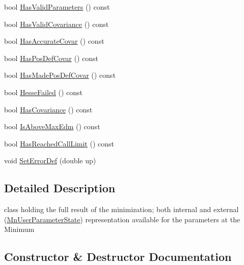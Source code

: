 \begin{DoxyCompactItemize}
bool \mbox{\hyperlink{classROOT_1_1Minuit2_1_1FunctionMinimum_a723b0ab6157e57113a142f1d4a31ace2}{Has\+Valid\+Parameters}} () const
\item 
bool \mbox{\hyperlink{classROOT_1_1Minuit2_1_1FunctionMinimum_ac2510d8f560ddac6b2911bda454e2948}{Has\+Valid\+Covariance}} () const
\item 
bool \mbox{\hyperlink{classROOT_1_1Minuit2_1_1FunctionMinimum_a5135f697042ef9ad81c68185c8610019}{Has\+Accurate\+Covar}} () const
\item 
bool \mbox{\hyperlink{classROOT_1_1Minuit2_1_1FunctionMinimum_acb9f7255fdd8afdb460bfe13e6d119c4}{Has\+Pos\+Def\+Covar}} () const
\item 
bool \mbox{\hyperlink{classROOT_1_1Minuit2_1_1FunctionMinimum_a7c0f417444609960c3b55bc869bf04d8}{Has\+Made\+Pos\+Def\+Covar}} () const
\item 
bool \mbox{\hyperlink{classROOT_1_1Minuit2_1_1FunctionMinimum_a6400b299323d7e632692229ce026056c}{Hesse\+Failed}} () const
\item 
bool \mbox{\hyperlink{classROOT_1_1Minuit2_1_1FunctionMinimum_ae11c13bd945f21476482d928bf96b791}{Has\+Covariance}} () const
\item 
bool \mbox{\hyperlink{classROOT_1_1Minuit2_1_1FunctionMinimum_aa87b9f0f50a77d219976b8767e39ac0f}{Is\+Above\+Max\+Edm}} () const
\item 
bool \mbox{\hyperlink{classROOT_1_1Minuit2_1_1FunctionMinimum_a524af3e3da7a975e7a104845c6a41ceb}{Has\+Reached\+Call\+Limit}} () const
\item 
void \mbox{\hyperlink{classROOT_1_1Minuit2_1_1FunctionMinimum_af45892d274c493850fc78e9917f17781}{Set\+Error\+Def}} (double up)
\end{DoxyCompactItemize}


\subsection{Detailed Description}
class holding the full result of the minimization; both internal and external (\mbox{\hyperlink{classROOT_1_1Minuit2_1_1MnUserParameterState}{Mn\+User\+Parameter\+State}}) representation available for the parameters at the Minimum 

\subsection{Constructor \& Destructor Documentation}
\mbox{\label{classROOT_1_1Minuit2_1_1FunctionMinimum_a907871106f0be755404d80f32fbe2041}} 
